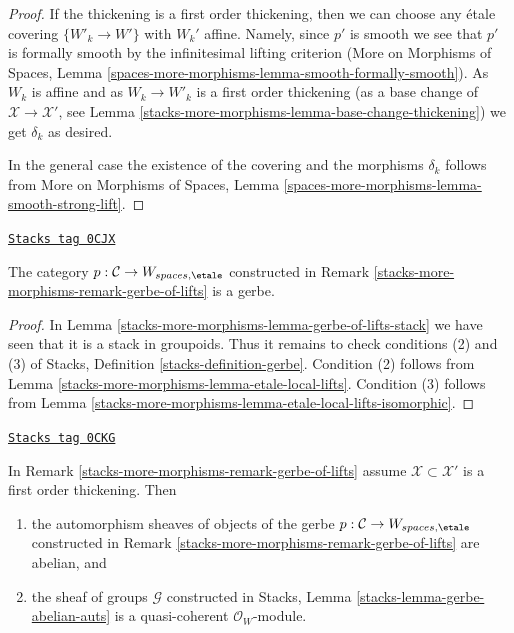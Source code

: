 \begin{proof}
\medskip\noindent
If the thickening is a first order thickening, then we can
choose any \'etale covering $\{W'_k \to W'\}$ with $W_k'$ affine.
Namely, since $p'$ is smooth we see that $p'$ is formally smooth by the
infinitesimal lifting criterion (More on Morphisms of Spaces, Lemma
\ref{spaces-more-morphisms-lemma-smooth-formally-smooth}).
As $W_k$ is affine and as $W_k \to W'_k$ is a first order thickening
(as a base change of $\mathcal{X} \to \mathcal{X}'$, see
Lemma \ref{stacks-more-morphisms-lemma-base-change-thickening}) we get $\delta_k$ as
desired.

\medskip\noindent
In the general case the existence of the covering and the morphisms
$\delta_k$ follows from More on Morphisms of Spaces, Lemma
\ref{spaces-more-morphisms-lemma-smooth-strong-lift}.
\end{proof}

\begin{lemma}
\label{stacks-more-morphisms-lemma-gerbe-of-lifts}
\href{https://stacks.math.columbia.edu/tag/0CJX}{\texttt{Stacks tag 0CJX}}

The category $p : \mathcal{C} \to W_{spaces, \etale}$ constructed
in Remark \ref{stacks-more-morphisms-remark-gerbe-of-lifts} is a gerbe.
\end{lemma}

\begin{proof}
In Lemma \ref{stacks-more-morphisms-lemma-gerbe-of-lifts-stack}
we have seen that it is a stack in groupoids.
Thus it remains to check conditions (2) and (3) of
Stacks, Definition \ref{stacks-definition-gerbe}.
Condition (2) follows from
Lemma \ref{stacks-more-morphisms-lemma-etale-local-lifts}.
Condition (3) follows from
Lemma \ref{stacks-more-morphisms-lemma-etale-local-lifts-isomorphic}.
\end{proof}

\begin{lemma}
\label{stacks-more-morphisms-lemma-gerbe-of-lifts-first-order}
\href{https://stacks.math.columbia.edu/tag/0CKG}{\texttt{Stacks tag 0CKG}}

In Remark \ref{stacks-more-morphisms-remark-gerbe-of-lifts} assume $\mathcal{X} \subset \mathcal{X}'$
is a first order thickening. Then
\begin{enumerate}
\item the automorphism sheaves of objects of the gerbe
$p : \mathcal{C} \to W_{spaces, \etale}$ constructed
in Remark \ref{stacks-more-morphisms-remark-gerbe-of-lifts} are abelian, and
\item the sheaf of groups $\mathcal{G}$ constructed in
Stacks, Lemma \ref{stacks-lemma-gerbe-abelian-auts}
is a quasi-coherent $\mathcal{O}_W$-module.
\end{enumerate}
\end{lemma}

